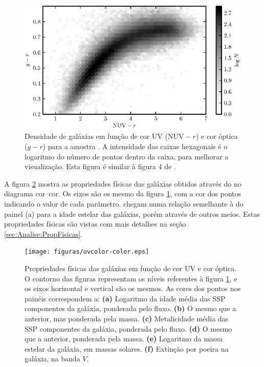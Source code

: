 \begin{figure}
	\includegraphics{figuras/uvcolor-color-density.eps}
	\caption[Densidade de galáxias no diagrama cor--cor UV.]
	{Densidade de galáxias em função de cor UV ($\mathrm{NUV}-r$) e cor óptica
	($g-r$) para a amostra \starlightUV. A intensidade das caixas hexagonais é o
	logaritmo do número de pontos dentro da caixa, para melhorar a visualização.
	Esta figura é similar à figura 4 de \citet{Chilingarian2011}.}
	\label{fig:DensityColor}
\end{figure}

A figura \ref{fig:ColorStarlightParam} mostra as propriedades físicas das
galáxias obtidos através do \starlight no diagrama cor--cor. Os eixos são os
mesmo da figura \ref{fig:DensityColor}, com a cor dos pontos indicando o valor
de cada parâmetro. \citeauthor{Chilingarian2011} chegam numa relação semelhante
à do painel (a) para a idade estelar das galáxias, porém através de outros
meios. Estas propriedades físicas são vistas com mais detalhes na seção
\ref{sec:Analise:PropFisicas}.

\begin{figure}
	\texttt{[image: figuras/uvcolor-color.eps]}
	\caption[Diagrama cor--cor para os diversos parâmetros \starlight.]
	{Propriedades físicas das galáxias em função de cor UV e cor óptica. O contorno
	das figuras representam os níveis referentes à figura \ref{fig:DensityColor},
	e os eixos horizontal e vertical são os mesmos. As cores dos pontos nos painéis
	correspondem a: \textbf{(a)} Logaritmo da idade média das SSP componentes da
	galáxia, ponderada pelo fluxo. \textbf{(b)} O mesmo que a anterior, mas
	ponderada pela massa. \textbf{(c)} Metalicidade média das SSP componentes da
	galáxia, ponderada pelo fluxo. \textbf{(d)} O mesmo que a anterior, ponderada
	pela massa. \textbf{(e)} Logaritmo da massa estelar da galáxia, em massas
	solares. \textbf{(f)} Extinção por poeira na galáxia, na banda $V$.}
	\label{fig:ColorStarlightParam}
\end{figure}


